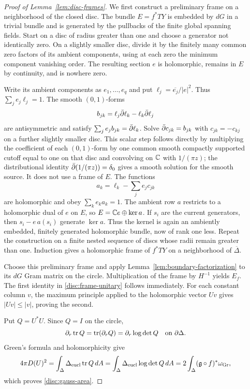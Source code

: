 \begin{proof}[Proof of Lemma~\ref{lem:disc-frames}]
We first construct a preliminary frame on a neighborhood of the closed
disc.  The bundle $E=f^*TY$ is embedded by $dG$ in a trivial bundle
and is generated by the pullbacks of the finite global spanning
fields.  Start on a disc of radius greater than one and choose a
generator not identically zero.  On a slightly smaller disc, divide
it by the finitely many common zero factors of its ambient
components, using at each zero the minimum component vanishing
order.  The resulting section $e$ is holomorphic, remains in $E$ by
continuity, and is nowhere zero.

Write its ambient components as $e_1,\ldots,e_q$ and put
$\ell_j=\overline{e_j}/|e|^2$.  Thus $\sum_j e_j\ell_j=1$.
The smooth $(0,1)$-forms
\[
 b_{jk}=\ell_j\bar\partial\ell_k-\ell_k\bar\partial\ell_j
\]
are antisymmetric and satisfy
$\sum_j e_jb_{jk}=\bar\partial\ell_k$.
Solve $\bar\partial c_{jk}=b_{jk}$ with $c_{jk}=-c_{kj}$ on a further
slightly smaller disc.  This scalar step follows directly by
multiplying the coefficient of each $(0,1)$-form by one common smooth
compactly supported cutoff equal to one on that disc and convolving
on $\mathbb C$ with $1/(\pi z)$;
the distributional identity
$\bar\partial(1/(\pi z))=\delta_0$ gives a smooth solution for the smooth
source.  It does not use a frame of $E$.
The functions
\[
 a_k=\ell_k-\sum_j e_jc_{jk}
\]
are holomorphic and obey $\sum_k e_ka_k=1$.
The ambient row $a$ restricts to a holomorphic dual of $e$ on $E$,
so $E=\mathbb C e\oplus\ker a$.  If $s_i$ are the current generators,
then $s_i-e\,a(s_i)$ generate $\ker a$.
Thus the kernel is again an ambiently embedded, finitely generated
holomorphic bundle, now of rank one less.  Repeat the construction
on a finite nested sequence of discs whose radii remain greater
than one.  Induction gives a holomorphic frame of $f^*TY$ on a
neighborhood of $\overline\Delta$.

Choose this preliminary frame and apply
Lemma~\ref{lem:boundary-factorization} to its $dG$ Gram matrix on
the circle.  Multiplication of the frame by $H^{-1}$ yields $E_f$.
The first identity in \eqref{disc:frame-unitary} follows immediately.
For each constant column $v$, the maximum principle applied to the
holomorphic vector $Uv$ gives $|Uv|\le|v|$, proving the second.

Put $Q=U^*U$.  Since $Q=I$ on the circle,
\[
 \partial_r\operatorname{tr} Q=\operatorname{tr}(\partial_rQ)
                =\partial_r\log\det Q
 \quad\hbox{on }\partial\Delta.
\]
Green's formula and holomorphicity give
\[
 4\pi D(U)^2
 =\int_\Delta\Delta_{\mathrm{eucl}}\operatorname{tr} Q\,dA
 =\int_\Delta\Delta_{\mathrm{eucl}}\log\det Q\,dA
 =2\int_\Delta(\mathfrak g\circ f)^*\omega_{\operatorname{Gr}},
\]
which proves \eqref{disc:gauss-area}.


\end{proof}
